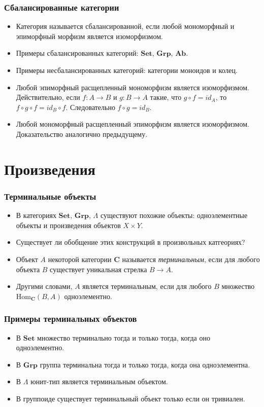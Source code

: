 \documentclass{beamer}
\theoremstyle{definition}
\newcommand{\cat}[1]{\mathbf{#1}}
\renewcommand{\C}{\cat{C}}
\newcommand{\Set}{\cat{Set}}
\newcommand{\Grp}{\cat{Grp}}
\newcommand{\Ab}{\cat{Ab}}
\newcommand{\fs}[1]{\mathrm{#1}}
\newcommand{\Hom}{\fs{Hom}}
\begin{document}
\begin{frame}
\frametitle{Сбалансированные категории}
\begin{itemize}
\item Категория называется сбалансированной, если любой мономорфный и эпиморфный морфизм является изоморфизмом.
\item Примеры сбалансированных категорий: $\Set$, $\Grp$, $\Ab$.
\item Примеры несбалансированных категорий: категории моноидов и колец.
\item Любой эпиморфный расщепленный мономорфизм является изоморфизмом.
Действительно, если $f : A \to B$ и $g : B \to A$ такие, что $g \circ f = id_A$, то $f \circ g \circ f = id_B \circ f$.
Следовательно $f \circ g = id_B$.
\item Любой мономорфный расщепленный эпиморфизм является изоморфизмом. Доказательство аналогично предыдущему.
\end{itemize}
\end{frame}

\section{Произведения}

\begin{frame}
\frametitle{Терминальные объекты}
\begin{itemize}
\item В категориях $\Set$, $\Grp$, $\Lambda$ существуют похожие объекты: одноэлементные объекты и произведения объектов $X \times Y$.
\item Существует ли обобщение этих конструкций в произвольных катгеориях?
\item Объект $A$ некоторой категории $\C$ называется \emph{терминальным}, если для любого объекта $B$ существует уникальная стрелка $B \to A$.
\item Другими словами, $A$ является терминальным, если для любого $B$ множество $\Hom_\C(B,A)$ одноэлементно.
\end{itemize}
\end{frame}

\begin{frame}
\frametitle{Примеры терминальных объектов}
\begin{itemize}
\item В $\Set$ множество терминально тогда и только тогда, когда оно одноэлементно.
\item В $\Grp$ группа терминальна тогда и только тогда, когда она одноэлементна.
\item В $\Lambda$ юнит-тип является терминальным объектом.
\item В группоиде существует терминальный объект только если он тривиален.
\end{itemize}
\end{frame}
\end{document}
